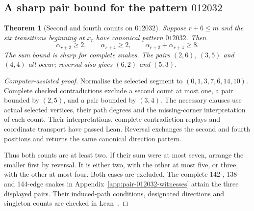 \documentclass[11pt,a4paper]{article}
\newtheorem{theorem}{Theorem}[section]
\theoremstyle{definition}
\theoremstyle{remark}
\begin{document}
\subsection{A sharp pair bound for the pattern $012032$}\label{sec:pair-012032}
\begin{theorem}[Second and fourth counts on $012032$]\label{thm:pair-012032}
Suppose $r+6\le m$ and the six transitions beginning at $x_r$ have canonical
pattern $012032$. Then
\[
\alpha_{r+2}\ge2,\qquad \alpha_{r+4}\ge2,\qquad
\alpha_{r+2}+\alpha_{r+4}\ge8.
\]
The sum bound is sharp for complete snakes. The pairs $(2,6)$, $(3,5)$ and
$(4,4)$ all occur; reversal also gives $(6,2)$ and $(5,3)$.
\end{theorem}
\begin{proof}[Computer-assisted proof]
Normalise the selected segment to $(0,1,3,7,6,14,10)$. Complete checked
contradictions exclude a second count at most one, a pair bounded by $(2,5)$,
and a pair bounded by $(3,4)$. The necessary clauses use actual selected
vertices, their path degrees and the missing-corner interpretation of each
count. Their interpretations, complete contradiction replays and coordinate
transport have passed Lean. Reversal exchanges the second and fourth
positions and returns the same canonical direction pattern.

Thus both counts are at least two. If their sum were at most seven, arrange
the smaller first by reversal. It is either two, with the other at most five,
or three, with the other at most four. Both cases are excluded. The complete
142-, 138- and 144-edge snakes in Appendix~\ref{app:pair-012032-witnesses}
attain the three displayed pairs. Their induced-path conditions, designated
directions and singleton counts are checked in Lean~\cite{pair012032archive}.
\end{proof}
\end{document}
